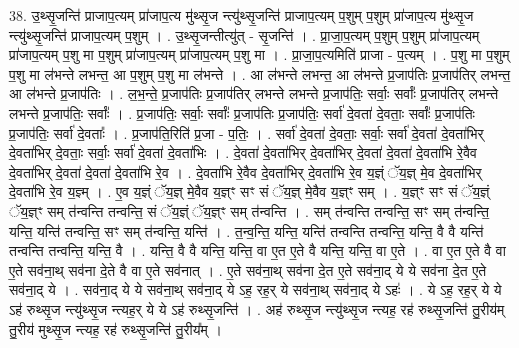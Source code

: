 \documentclass[17pt]{extarticle}
\begin{document}
38. उ॒थ्सृ॒जन्ति॑ प्राजाप॒त्यम् प्रा॑जाप॒त्य मु॑थ्सृ॒ज न्त्यु॑थ्सृ॒जन्ति॑ प्राजाप॒त्यम् प॒शुम् प॒शुम् प्रा॑जाप॒त्य मु॑थ्सृ॒ज न्त्यु॑थ्सृ॒जन्ति॑ प्राजाप॒त्यम् प॒शुम् । . उ॒थ्सृ॒जन्तीत्यु॑त् - सृ॒जन्ति॑ । . प्रा॒जा॒प॒त्यम् प॒शुम् प॒शुम् प्रा॑जाप॒त्यम् प्रा॑जाप॒त्यम् प॒शु मा प॒शुम् प्रा॑जाप॒त्यम् प्रा॑जाप॒त्यम् प॒शु मा । . प्रा॒जा॒प॒त्यमिति॑ प्राजा - प॒त्यम् । . प॒शु मा प॒शुम् प॒शु मा ल॑भन्ते लभन्त॒ आ प॒शुम् प॒शु मा ल॑भन्ते । . आ ल॑भन्ते लभन्त॒ आ ल॑भन्ते प्र॒जाप॑तिः प्र॒जाप॑तिर् लभन्त॒ आ ल॑भन्ते प्र॒जाप॑तिः । . ल॒भ॒न्ते॒ प्र॒जाप॑तिः प्र॒जाप॑तिर् लभन्ते लभन्ते प्र॒जाप॑तिः॒ सर्वाः॒ सर्वाः᳚ प्र॒जाप॑तिर् लभन्ते लभन्ते प्र॒जाप॑तिः॒ सर्वाः᳚ । . प्र॒जाप॑तिः॒ सर्वाः॒ सर्वाः᳚ प्र॒जाप॑तिः प्र॒जाप॑तिः॒ सर्वा॑ दे॒वता॑ दे॒वताः॒ सर्वाः᳚ प्र॒जाप॑तिः प्र॒जाप॑तिः॒ सर्वा॑ दे॒वताः᳚ । . प्र॒जाप॑ति॒रिति॑ प्र॒जा - प॒तिः॒ । . सर्वा॑ दे॒वता॑ दे॒वताः॒ सर्वाः॒ सर्वा॑ दे॒वता॑ दे॒वता॑भिर् दे॒वता॑भिर् दे॒वताः॒ सर्वाः॒ सर्वा॑ दे॒वता॑ दे॒वता॑भिः । . दे॒वता॑ दे॒वता॑भिर् दे॒वता॑भिर् दे॒वता॑ दे॒वता॑ दे॒वता॑भि रे॒वैव दे॒वता॑भिर् दे॒वता॑ दे॒वता॑ दे॒वता॑भि रे॒व । . दे॒वता॑भि रे॒वैव दे॒वता॑भिर् दे॒वता॑भि रे॒व य॒ज्ञ्ं ॅय॒ज्ञ् मे॒व दे॒वता॑भिर् दे॒वता॑भि रे॒व य॒ज्ञ्म् । . ए॒व य॒ज्ञ्ं ॅय॒ज्ञ् मे॒वैव य॒ज्ञ्ꣳ सꣳ सं ॅय॒ज्ञ् मे॒वैव य॒ज्ञ्ꣳ सम् । . य॒ज्ञ्ꣳ सꣳ सं ॅय॒ज्ञ्ं ॅय॒ज्ञ्ꣳ सम् त॑न्वन्ति तन्वन्ति॒ सं ॅय॒ज्ञ्ं ॅय॒ज्ञ्ꣳ सम् त॑न्वन्ति । . सम् त॑न्वन्ति तन्वन्ति॒ सꣳ सम् त॑न्वन्ति॒ यन्ति॒ यन्ति॑ तन्वन्ति॒ सꣳ सम् त॑न्वन्ति॒ यन्ति॑ । . त॒न्व॒न्ति॒ यन्ति॒ यन्ति॑ तन्वन्ति तन्वन्ति॒ यन्ति॒ वै वै यन्ति॑ तन्वन्ति तन्वन्ति॒ यन्ति॒ वै । . यन्ति॒ वै वै यन्ति॒ यन्ति॒ वा ए॒त ए॒ते वै यन्ति॒ यन्ति॒ वा ए॒ते । . वा ए॒त ए॒ते वै वा ए॒ते सव॑ना॒थ् सव॑ना दे॒ते वै वा ए॒ते सव॑नात् । . ए॒ते सव॑ना॒थ् सव॑ना दे॒त ए॒ते सव॑ना॒द् ये ये सव॑ना दे॒त ए॒ते सव॑ना॒द् ये । . सव॑ना॒द् ये ये सव॑ना॒थ् सव॑ना॒द् ये ऽह॒ रह॒र् ये सव॑ना॒थ् सव॑ना॒द् ये ऽहः॑ । . ये ऽह॒ रह॒र् ये ये ऽह॑ रुथ्सृ॒ज न्त्यु॑थ्सृ॒ज न्त्यह॒र् ये ये ऽह॑ रुथ्सृ॒जन्ति॑ । . अह॑ रुथ्सृ॒ज न्त्यु॑थ्सृ॒ज न्त्यह॒ रह॑ रुथ्सृ॒जन्ति॑ तु॒रीय॑म् तु॒रीय॑ मुथ्सृ॒ज न्त्यह॒ रह॑ रुथ्सृ॒जन्ति॑ तु॒रीय᳚म् । \newline
\pagebreak
{}
\end{document}
